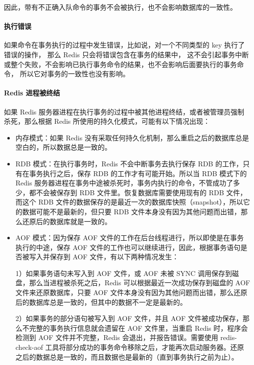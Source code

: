 \documentclass[a4paper,11pt,english]{sphinxmanual}
\begin{document}
因此，带有不正确入队命令的事务不会被执行，也不会影响数据库的一致性。


\paragraph{执行错误}
\label{feature/transaction:id11}
如果命令在事务执行的过程中发生错误，比如说，对一个不同类型的 key 执行了错误的操作，
那么 Redis 只会将错误包含在事务的结果中，
这不会引起事务中断或整个失败，不会影响已执行事务命令的结果，也不会影响后面要执行的事务命令，
所以它对事务的一致性也没有影响。


\paragraph{Redis 进程被终结}
\label{feature/transaction:redis}
如果 Redis 服务器进程在执行事务的过程中被其他进程终结，或者被管理员强制杀死，那么根据 Redis 所使用的持久化模式，可能有以下情况出现：
\begin{itemize}
\item {} 
内存模式：如果 Redis 没有采取任何持久化机制，那么重启之后的数据库总是空白的，所以数据总是一致的。

\item {} 
RDB 模式：在执行事务时，Redis 不会中断事务去执行保存 RDB 的工作，只有在事务执行之后，保存 RDB 的工作才有可能开始。所以当 RDB 模式下的 Redis 服务器进程在事务中途被杀死时，事务内执行的命令，不管成功了多少，都不会被保存到 RDB 文件里。恢复数据库需要使用现有的 RDB 文件，而这个 RDB 文件的数据保存的是最近一次的数据库快照（snapshot），所以它的数据可能不是最新的，但只要 RDB 文件本身没有因为其他问题而出错，那么还原后的数据库就是一致的。

\item {} 
AOF 模式：因为保存 AOF 文件的工作在后台线程进行，所以即使是在事务执行的中途，保存 AOF 文件的工作也可以继续进行，因此，根据事务语句是否被写入并保存到 AOF 文件，有以下两种情况发生：

1）如果事务语句未写入到 AOF 文件，或 AOF 未被 SYNC 调用保存到磁盘，那么当进程被杀死之后，Redis 可以根据最近一次成功保存到磁盘的 AOF 文件来还原数据库，只要 AOF 文件本身没有因为其他问题而出错，那么还原后的数据库总是一致的，但其中的数据不一定是最新的。

2）如果事务的部分语句被写入到 AOF 文件，并且 AOF 文件被成功保存，那么不完整的事务执行信息就会遗留在 AOF 文件里，当重启 Redis 时，程序会检测到 AOF 文件并不完整，Redis 会退出，并报告错误。需要使用 redis-check-aof 工具将部分成功的事务命令移除之后，才能再次启动服务器。还原之后的数据总是一致的，而且数据也是最新的（直到事务执行之前为止）。

\end{itemize}
\end{document}
